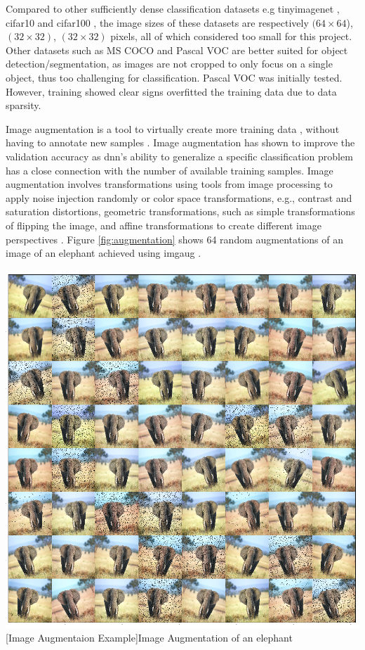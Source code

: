 \begin{enumdescript}
\begin{enumdescript}
		Compared to other sufficiently dense classification datasets e.g \gls{tinyimagenet} \cite{li_cs231n:_2018}, \gls{cifar10} and \gls{cifar100} \cite{krizhevsky_cifar-10_nodate}, the image sizes of these datasets are respectively $(64\times 64$), $(32\times 32)$, $(32\times 32)$ pixels, all of which considered too small for this project. Other datasets such as MS COCO and Pascal VOC are better suited for object detection/segmentation, as images are not cropped to only focus on a single object, thus too challenging for classification. Pascal VOC was initially tested. However, training showed clear signs overfitted the training data due to data sparsity. 
		
		\item[Image Augmentation] Image augmentation is a tool to virtually create more training data \cite{perez_effectiveness_2017}, without having to annotate new samples \cite{goodfellow_deep_2016}. Image augmentation has shown to improve the validation accuracy as \gls{dnn}'s ability to generalize a specific classification problem has a close connection with the number of available training samples.
		Image augmentation involves transformations using tools from image processing to apply noise injection randomly or color space transformations, e.g., contrast and saturation distortions, geometric transformations, such as simple transformations of flipping the image, and affine transformations to create different image perspectives \cite{shorten_survey_2019}. Figure \ref{fig:augmentation} shows 64 random augmentations of an image of an elephant achieved using \gls{imgaug} \cite{jung_imgaug:_nodate}.  
		
		\begin{minipage}[t]{\linewidth}
			\centering
			\includegraphics[width=.7\linewidth]{figures/augmentation/augmentation_high_resolution.png}
			[Image Augmentaion Example]{Image Augmentation of an elephant}
			\label{fig:augmentation}
		\end{minipage}
		

\end{enumdescript}
\end{enumdescript}
